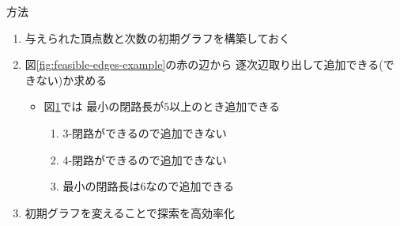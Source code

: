\begin{frame}{方法}
  \begin{enumerate}
  \item 与えられた頂点数と次数の初期グラフを構築しておく
  \item 図\ref{fig:feasible-edges-example}の赤の辺から
    逐次辺取り出して追加できる(できない)か求める
    \begin{itemize}
    \item 図\ref{fig:feasible-edges-example2}では
      最小の閉路長が$5$以上のとき追加できる
      \begin{enumerate}[a]
      \item 3-閉路ができるので追加できない
      \item 4-閉路ができるので追加できない
      \item 最小の閉路長は6なので追加できる
      \end{enumerate}
    \end{itemize}
    \item 初期グラフを変えることで探索を高効率化
  \end{enumerate}
  \begin{figure}
    \centering
    \begin{minipage}{.4\columnwidth}
      \def\svgwidth{\textwidth}
      
      \label{fig:feasible-edges-example}
    \end{minipage}
    \hspace{1em}
    \begin{minipage}{.4\columnwidth}
      \def\svgwidth{\textwidth}
      
      \label{fig:feasible-edges-example2}
    \end{minipage}
  \end{figure}
\end{frame}

